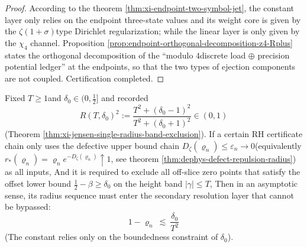 \begin{proof}
According to the theorem \ref{thm:xi-endpoint-two-symbol-jet}, the constant layer only relies on the endpoint three-state values ​​and its weight core is given by the \(\zeta(1+\sigma)\) ​​type Dirichlet regularization; while the linear layer is only given by the \(\chi_4\) channel.
Proposition \ref{prop:endpoint-orthogonal-decomposition-z4-Rplus} states the orthogonal decomposition of the “modulo \(4\) ​​discrete load \(\oplus\) precision potential ledger” at the endpoints, so that the two types of ejection components are not coupled. Certification completed.
\end{proof}

\begin{theorem}\label{thm:xi-jensen-quadratic-resolution-barrier}
Fixed \(T\ge 1\) ​​and \(\delta_0\in(0,\tfrac12]\) and recorded
\[
R(T,\delta_0)^2:=\frac{T^2+(\delta_0-1)^2}{T^2+(\delta_0+1)^2}\in(0,1)
\]
(Theorem \ref{thm:xi-jensen-single-radius-band-exclusion}).
If a certain RH certificate chain only uses the defective upper bound chain \(D_\zeta(\varrho_n)\le \varepsilon_n\to 0\) ​​(equivalently \(r_\ast(\varrho_n)=\varrho_n e^{-D_\zeta(\varrho_n)}\uparrow 1\), see theorem \ref{thm:dephys-defect-repulsion-radius}) as all inputs,
And it is required to exclude all off-slice zero points that satisfy the offset lower bound \(\tfrac12-\beta\ge\delta_0\) on the height band \(|\gamma|\le T\),
Then in an asymptotic sense, its radius sequence must enter the secondary resolution layer that cannot be bypassed:
\begin{equation}\label{eq:xi-jensen-quadratic-resolution-barrier}
\boxed{\;
1-\varrho_n\ \lesssim\ \frac{\delta_0}{T^2}\;}
\end{equation}
(The constant relies only on the boundedness constraint of \(\delta_0\)).
\end{theorem}

